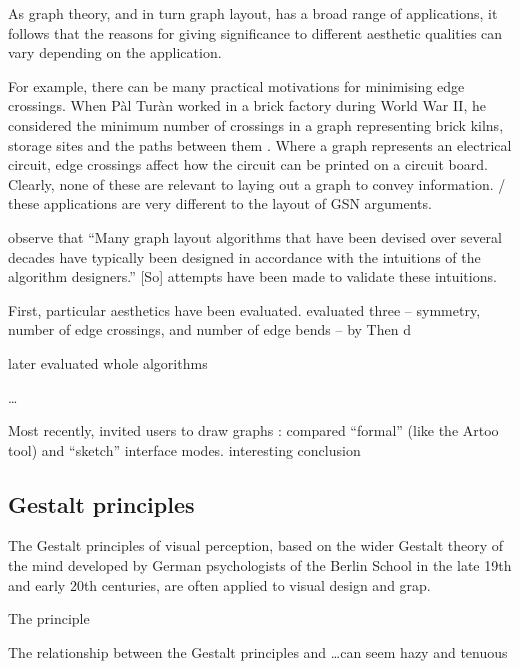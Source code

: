 As graph theory, and in turn graph layout, has a broad range of applications, it follows that the reasons for giving significance to different aesthetic qualities can vary depending on the application.

For example, there can be many practical motivations for minimising edge crossings.
When P\`{a}l Tur\`{a}n worked in a brick factory during World War II,
he considered the minimum number of crossings in a graph representing
brick kilns, storage sites and the paths between them .
Where a graph represents an electrical circuit, edge crossings affect how the circuit can be printed on a circuit board.
Clearly, none of these are relevant to laying out a graph to convey information. / these applications are very different to the layout of GSN arguments.

\citet{5674033} observe that ``Many graph layout algorithms that have been devised over
several decades have typically been designed in accordance with the intuitions of the algorithm designers.'' [So] attempts have been made to validate these intuitions.

First, particular aesthetics have been evaluated. \citet{Purchase1997basis} evaluated three -- symmetry, number of edge crossings, and number of edge bends -- by Then \citet{Purchase1997which} d


\citet{PURCHASE1998647} later evaluated whole algorithms

\ldots


Most recently, \citet{5674033} invited users to draw graphs :
compared ``formal'' (like the Artoo tool) and ``sketch'' interface modes.
interesting conclusion



\subsection{Gestalt principles}

The Gestalt principles of visual perception,
based on the wider Gestalt theory of the mind developed by German psychologists of the Berlin School in the late 19th and early 20th centuries,
are often applied to visual design and grap.

The principle 

The relationship between the Gestalt principles and \ldots can seem hazy and tenuous





